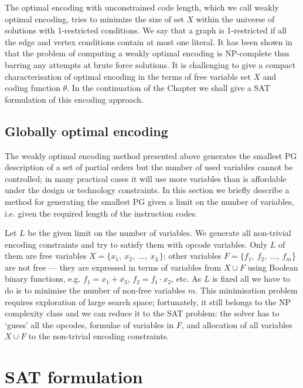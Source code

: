 The optimal encoding with unconstrained code length, which we call weakly optimal encoding, tries to minimize the size of set $X$ within the universe of solutions with 1-restricted conditions. We say that a graph is 1-restricted if all the edge and vertex conditions contain at most one literal. It has been shown in \cite{2009_mokhov_phd} that the problem of computing a weakly optimal encoding is NP-complete thus barring any attempts at brute force solutions. It is challenging to give a compact characterisation of optimal encoding in the terms of free variable set $X$ and coding function $\theta$. In the continuation of the Chapter we shall give a SAT formulation of this encoding approach. 


\subsection{Globally optimal encoding\label{Sec:Generating-optimal-opcodes}}

The weakly optimal encoding method presented above generates the smallest
PG description of a set of partial orders but the number of used
variables cannot be controlled; in many practical cases it will use
more variables than is affordable under the design or technology constraints.
In this section we briefly describe a method for generating the smallest
PG given a limit on the number of variables, i.e. given the required
length of the instruction codes.

Let $L$ be the given limit on the number of variables. We generate all non-trivial
encoding constraints and try to satisfy them with opcode variables.
Only $L$ of them are free variables $X=\{x_{1},\ x_{2},\ ...,\ x_{L}\}$;
other variables $F=\{f_{1},\ f_{2},\ ...,\ f_{m}$\} are not free
--- they are expressed in terms of variables from $X\cup F$ using
Boolean binary functions, e.g. $f_{1}=x_{1}+\overline{x_{3}}$, $f_{2}=f_{1}\cdot x_{2}$,
etc. As $L$ is fixed all we have to do is to minimise the number
of non-free variables $m$. This minimisation problem requires exploration
of large search space; fortunately, it still belongs to the NP complexity
class and we can reduce it to the SAT problem: the solver has to `guess'
all the opcodes, formulae of variables in $F$, and allocation of
all variables $X\cup F$ to the non-trivial encoding constraints.


\section{SAT formulation\label{sec:SAT-formulation}}

